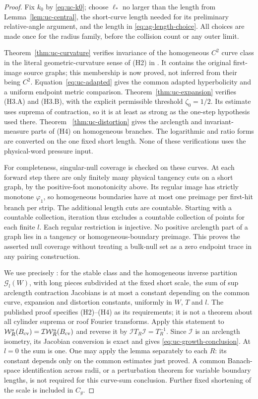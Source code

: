 \begin{proof}
Fix $k_0$ by \eqref{eq:uc-k0}; choose $\ell_*$ no larger than the
length from Lemma~\ref{lem:uc-central}, the short-curve length needed
for its preliminary relative-angle argument, and the length in
\eqref{eq:ag-length-choice}. All choices are made once for the
radius family, before the collision count or any outer limit.

Theorem~\ref{thm:uc-curvature} verifies invariance of the homogeneous
$C^2$ curve class in the literal geometric-curvature sense of (H2) in
\cite{DZUniform}. It contains the original first-image source graphs;
this membership is now proved, not inferred from their being $C^2$.
Equation~\eqref{eq:uc-adapted} gives the common adapted hyperbolicity
and a uniform endpoint metric comparison. Theorem~\ref{thm:uc-expansion}
verifies (H3.A) and (H3.B), with the explicit permissible threshold
$\zeta_0=1/2$. Its estimate uses suprema of contraction, so it is at
least as strong as the one-step hypothesis used there. Theorem~
\ref{thm:uc-distortion} gives the arclength and invariant-measure parts
of (H4) on homogeneous branches. The logarithmic and ratio forms are
converted on the one fixed short length. None of these verifications
uses the physical-word pressure input.

For completeness, singular-null coverage is checked on these curves.
At each forward step there are only finitely many physical tangency
cuts on a short graph, by the positive-foot monotonicity above. Its
regular image has strictly monotone $\varphi_1$, so homogeneous
boundaries have at most one preimage per first-hit branch per strip.
The additional length cuts are countable. Starting with a countable
collection, iteration thus excludes a countable collection of points
for each finite $l$. Each regular restriction is injective. No positive
arclength part of a graph lies in a tangency or homogeneous-boundary
preimage. This proves the asserted null coverage without treating a
bulk-null set as a zero endpoint trace in any pairing construction.

We use precisely \cite[Lemma 3.2(b), p.~14]{DZUniform}: for the stable
class and the homogeneous inverse partition $\mathcal G_l(W)$, with
long pieces subdivided at the fixed short scale, the sum of sup
arclength contraction Jacobians is at most a constant depending on
the common curve, expansion and distortion constants, uniformly in
$W$, $T$ and $l$. The published proof specifies (H2)--(H4) as its
requirements; it is not a theorem about all cylinder suprema or roof
Fourier transforms. Apply this statement to
$\mathcal W_R^s(B_{\rm cv})=\mathcal I\mathcal W_R^u(B_{\rm cv})$ and reverse it by
$\mathcal I T_R\mathcal I=T_R^{-1}$. Since $\mathcal I$ is an
arclength isometry, its Jacobian conversion is exact and gives
\eqref{eq:uc-growth-conclusion}. At $l=0$ the sum is one.
One may apply the lemma separately to each $R$: its constant depends
only on the common estimates just proved. A common Banach-space
identification across radii, or a perturbation theorem for variable
boundary lengths, is not required for this curve-sum conclusion.
Further fixed shortening of the scale is included in $C_g$.
\end{proof}

